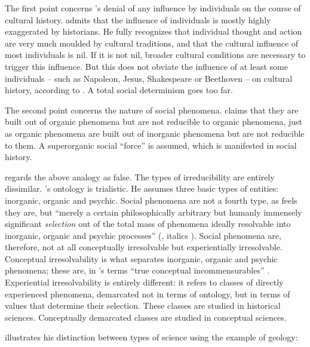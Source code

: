\documentclass[output=paper]{langscibook}
\begin{document}
The first point concerns {\Kroeber}'s denial of any influence by individuals on the course of cultural history. {\Sapir} admits that the influence of individuals is mostly highly exaggerated by historians. He fully recognizes that individual thought and action are very much moulded by cultural traditions, and that the cultural influence of most individuals is nil. If it is not nil, broader cultural conditions are necessary to trigger this influence. But this does not obviate the influence of at least some individuals -- such as Napoleon, Jesus, Shakespeare or Beethoven -- on cultural history, according to {\Sapir}. A total social determinism goes too far.

The second point concerns the nature of social phenomena. {\Kroeber} claims that they are built out of organic phenomena but are not reducible to organic phenomena, just as organic phenomena are built out of inorganic phenomena but are not reducible to them. A superorganic social ``force'' is assumed, which is manifested in social history.

{\Sapir} regards the above analogy as false. The types of irreducibility are entirely dissimilar. {\Sapir}'s ontology is trialistic. He assumes three basic types of entities: inorganic, organic and psychic. Social phenomena are not a fourth type, as {\Kroeber} feels they are, but ``merely a certain philosophically arbitrary but humanly immensely significant \emph{selection} out of the total mass of phenomena ideally resolvable into inorganic, organic and psychic processes'' (\citealt[444]{Sapir1917}, italics {\Sapir}). Social phenomena are, therefore, not at all conceptually irresolvable but experientially irresolvable. Conceptual irresolvability is what separates inorganic, organic and psychic phenomena; these are, in {\Sapir}'s terms ``true conceptual incommensurables'' \citep[445]{Sapir1917}. Experiential irresolvability is entirely different: it refers to classes of directly experienced phenomena, demarcated not in terms of ontology, but in terms of values that determine their selection. These classes are studied in historical sciences. Conceptually demarcated classes are studied in conceptual sciences.

{\Sapir} illustrates his distinction between types of science using the example of geology:
\end{document}
